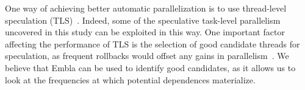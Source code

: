 One way of achieving better automatic parallelization is to use
thread-level speculation (TLS)~\cite{Rundberg01anall-software,
gregory05stampede, welc05safe}.  Indeed, some of the speculative
task-level parallelism uncovered in this study can be exploited in
this way.  One important factor affecting the performance of TLS is
the selection of good candidate threads for speculation, as frequent
rollbacks would offset any gains in parallelism~\cite{johnson04mincut,
liu06posh}.  We believe that Embla can be used to identify good
candidates, as it allows us to look at the frequencies at which
potential dependences materialize.
